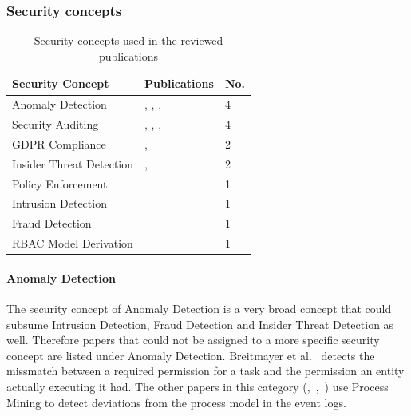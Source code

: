 \documentclass[runningheads]{llncs}
\begin{document}
\subsubsection{Security concepts}\label{concepts}
\begin{table}
    \centering
    \caption{Security concepts used in the reviewed publications}
    \label{concepts_table}
    \begin{tabular}{ | l | l | l | }
        \hline
        \textbf{Security Concept} & \textbf{Publications}                                                                           & \textbf{No. } \\
        \hline
        \hline
        Anomaly Detection         & \cite{Fazzinga2020}, \cite{MozafariMehr2022397}, \cite{Breitmayer202411}, \cite{Sarno2020}      & 4                            \\
        \hline
        Security Auditing         & \cite{Accorsi20131462}, \cite{Zahoransky2014360}, \cite{Yunizal20221387}, \cite{Dedousis202235} & 4                            \\
        \hline
        GDPR Compliance           & \cite{Zaman20192982}, \cite{MozafariMehr202182}                                                 & 2                            \\
        \hline
        Insider Threat Detection  & \cite{Zhu201783}, \cite{MacAk2020}                                                              & 2                            \\
        \hline
        Policy Enforcement        & \cite{Talamo2013}                                                                               & 1                            \\
        \hline
        Intrusion Detection       & \cite{Mishra2018613}                                                                            & 1                            \\
        \hline
        Fraud Detection           & \cite{Mardani2013}                                                                              & 1                            \\
        \hline
        RBAC Model Derivation     & \cite{Leitner2013719}                                                                           & 1                            \\
        \hline
    \end{tabular}
\end{table}
\paragraph{Anomaly Detection} The security concept of Anomaly Detection is a very broad concept that could subsume Intrusion Detection, Fraud Detection and Insider Threat Detection as well. Therefore papers that could not be assigned to a more specific security concept
are listed under Anomaly Detection. Breitmayer et al.~\cite{Breitmayer202411} detects the missmatch between a required permission for a task and the permission an entity actually executing it had. The other papers in this category (\cite{Fazzinga2020},~\cite{MozafariMehr2022397},~\cite{Sarno2020})
use Process Mining to detect deviations from the process model in the event logs.
\end{document}
